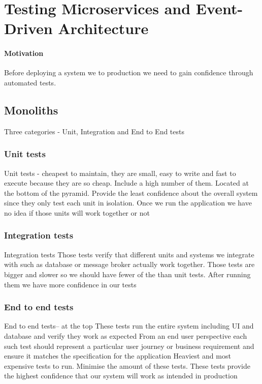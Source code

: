 \section{Testing Microservices and Event-Driven Architecture}

\paragraph{Motivation} Before deploying a system we to production we need to gain confidence through automated tests.

\subsection{Monoliths}
Three categories - Unit, Integration and End to End tests

\subsubsection{Unit tests}
Unit tests - cheapest to maintain, they are small, easy to write and fast to execute because they are so cheap.
Include a high number of them.
Located at the bottom of the pyramid.
Provide the least confidence about the overall system since they only test each unit in isolation.
Once we run the application we have no idea if those units will work together or not

\subsubsection{Integration tests}
Integration tests
Those tests verify that different units and systems we integrate with such as database or message broker actually work together.
Those tests are bigger and slower so we should have fewer of the than unit tests.
After running them we have more confidence in our tests

\subsubsection{End to end tests}
End to end tests-- at the top
These tests run the entire system including UI and database and verify they work as expected
From an end user perspective each such test should represent a particular user journey or business requirement and ensure it matches the specification for the application
Heaviest and most expensive tests to run.
Minimise the amount of these tests.
These tests provide the highest confidence that our system will work as intended in production

